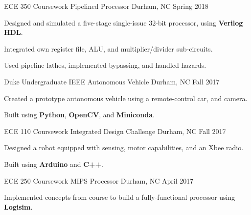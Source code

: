 \begin{cventries}
  \cventry
    {ECE 350 Coursework}
    {Pipelined Processor}
    {Durham, NC}
    {Spring 2018}
    {
       \begin{cvitems}
         \item {Designed and simulated a five-stage single-issue 32-bit processor, using \textbf{Verilog HDL}.}
         \item {Integrated own register file, ALU, and multiplier/divider sub-circuits.}
         \item {Used pipeline lathes, implemented bypassing, and handled hazards.}
       \end{cvitems}
   }
  \cventry
    {Duke Undergraduate IEEE} %
    {Autonomous Vehicle}
    {Durham, NC} %
    {Fall 2017} %
    {
      \begin{cvitems} %
        \item {Created a prototype autonomous vehicle using a remote-control car, and camera.}
        \item {Built using \textbf{Python}, \textbf{OpenCV}, and \textbf{Miniconda}.}
      \end{cvitems}
    }
  \cventry
    {ECE 110 Coursework}
    {Integrated Design Challenge}
    {Durham, NC}
    {Fall 2017}
    {
      \begin{cvitems}
        \item {Designed a robot equipped with sensing, motor capabilities, and an Xbee radio.}
        \item {Built using \textbf{Arduino} and \textbf{C++}.}
      \end{cvitems}
    }
  \cventry
    {ECE 250 Coursework} %
    {MIPS Processor}
    {Durham, NC} %
    {April 2017} %
    {
      \begin{cvitems} %
        \item {Implemented concepts from course to build a fully-functional processor using \textbf{Logisim}.}
      \end{cvitems}
    }
\end{cventries}
